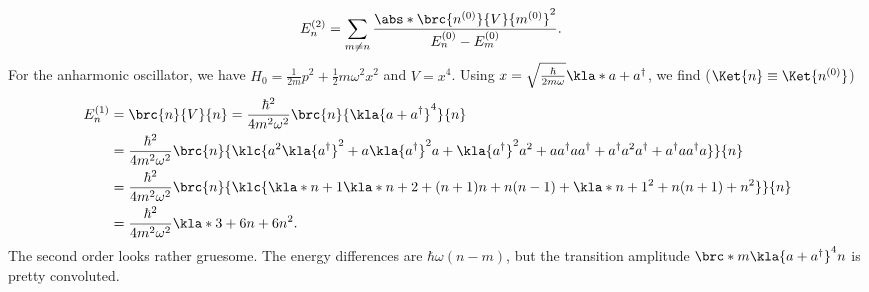 \documentclass[english, parskip=full]{scrartcl}
\begin{document}
\begin{align}
E_n^{(2)} &= \sum_{m\neq n} \frac{\abs*{\brc{n^{(0)}}{V}{m^{(0)}}}^2}{E_n^{(0)} - E_m^{(0)}}.
\end{align}
For the anharmonic oscillator, we have $H_0 = \frac{1}{2m}p^2 + \frac{1}{2} m\omega^2x^2$ and $V=x^4$.
Using $x = \sqrt{\frac{\hbar}{2m\omega}} \kla*{a + a^\dagger}$, we find ($\Ket{n} \equiv \Ket{n^{(0)}}$)
\begin{align}
E_n^{(1)} &= \brc{n}{V}{n} = \frac{\hbar^2}{4m^2\omega^2} \brc{n}{\kla{a+a^\dagger}^4}{n} \\
&= \frac{\hbar^2}{4m^2\omega^2} \brc{n}{\klc{a^2 \kla{a^\dagger}^2 + a \kla{a^\dagger}^2 a + \kla{a^\dagger}^2 a^2 + aa^\dagger aa^\dagger + a^\dagger a^2 a^\dagger + a^\dagger aa^\dagger a}}{n}\\
&= \frac{\hbar^2}{4m^2\omega^2} \brc{n}{\klc{\kla*{n+1}\kla*{n+2} + (n+1)n + n(n-1) + \kla*{n+1}^2 + n(n+1) + n^2}}{n}\\
&= \frac{\hbar^2}{4m^2\omega^2} \kla*{3 + 6n + 6n^2}.
\end{align}
The second order looks rather gruesome.
The energy differences are $\hbar\omega (n-m)$, but the transition amplitude $\brc*{m}{\kla{a+a^\dagger}^4}{n}$ is pretty convoluted.
\end{document}
